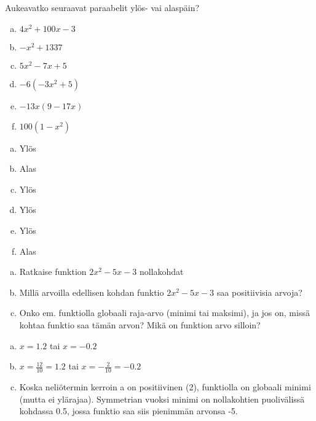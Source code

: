 \Harjoitustehtavat

\begin{tehtava}
  Aukeavatko seuraavat paraabelit ylös- vai alaspäin?
  \begin{enumerate}[a)]
    \item $4x^2 + 100x - 3$
    \item $-x^2 + 1337$
    \item $5x^2 - 7x + 5$
    \item $-6(-3x^2 + 5)$
    \item $-13x(9 - 17x)$
    \item $100(1-x^2)$
  \end{enumerate}

  \begin{vastaus}
    \begin{enumerate}[a)]
      \item Ylös
      \item Alas
      \item Ylös
      \item Ylös
      \item Ylös
      \item Alas
    \end{enumerate}
  \end{vastaus}
\end{tehtava}

\begin{tehtava}
  \begin{enumerate}[a)]
    \item Ratkaise funktion $2x^2 - 5x - 3$ nollakohdat
    \item Millä arvoilla edellisen kohdan funktio $2x^2 - 5x - 3$ saa positiivisia arvoja?
    \item Onko em. funktiolla globaali raja-arvo (minimi tai maksimi), ja jos on, missä kohtaa funktio saa tämän arvon? Mikä on funktion arvo silloin?
  \end{enumerate}

  \begin{vastaus}
    \begin{enumerate}[a)]
      \item $x = 1.2$ tai $x = -0.2$
      \item $x = \frac{12}{10} = 1.2$ tai $x = -\frac{2}{10} = -0.2$
      \item Koska neliötermin kerroin a on positiivinen (2), funktiolla on globaali minimi (mutta ei ylärajaa). Symmetrian vuoksi minimi on nollakohtien puolivälissä kohdassa 0.5, jossa funktio saa siis pienimmän arvonsa -5.
    \end{enumerate}
  \end{vastaus}
\end{tehtava}

